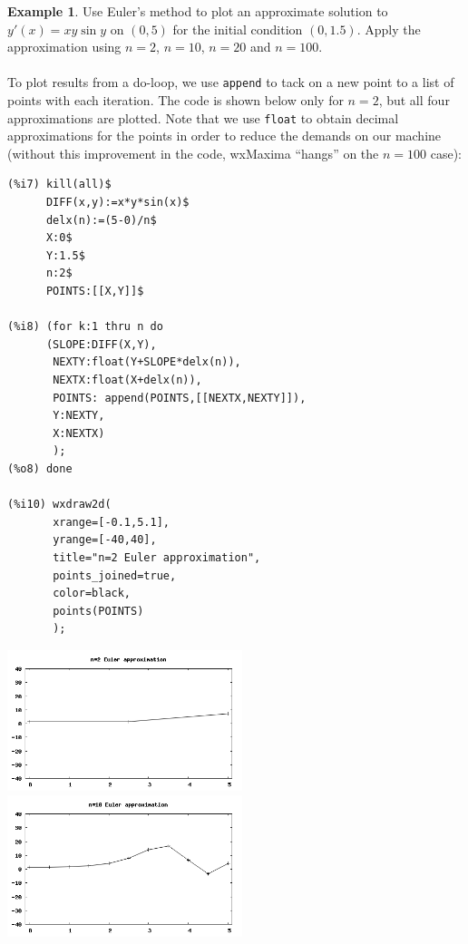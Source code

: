 \documentclass[10.5pt,twoside]{report}
\theoremstyle{definition}
\newtheorem{exmp}{Example}[section]
\begin{document}
\begin{exmp} Use Euler's method to plot an approximate solution to $y'(x)=xy\sin{y}$ on $(0,5)$ for the initial condition $(0,1.5)$.  Apply the approximation using $n=2$, $n=10$, $n=20$ and $n=100$.\\
${}$\\
To plot results from a do-loop, we use \verb|append| to tack on a new point to a list of points with each iteration.  The code is shown below only for $n=2$, but all four approximations are plotted.  Note that we use \verb|float| to obtain decimal approximations for the points in order to reduce the demands on our machine (without this improvement in the code, wxMaxima ``hangs'' on the $n=100$ case):

\begin{verbatim}
(%i7) kill(all)$
      DIFF(x,y):=x*y*sin(x)$
      delx(n):=(5-0)/n$
      X:0$
      Y:1.5$
      n:2$
      POINTS:[[X,Y]]$
      
(%i8) (for k:1 thru n do
      (SLOPE:DIFF(X,Y),
       NEXTY:float(Y+SLOPE*delx(n)),
       NEXTX:float(X+delx(n)),
       POINTS: append(POINTS,[[NEXTX,NEXTY]]),
       Y:NEXTY,
       X:NEXTX)
       );
(%o8) done

(%i10) wxdraw2d(
       xrange=[-0.1,5.1],
       yrange=[-40,40],
       title="n=2 Euler approximation",
       points_joined=true,
       color=black,
       points(POINTS)
       );
\end{verbatim}

\includegraphics[width=2.7in]{example_4_5_2_1}
\includegraphics[width=2.7in]{example_4_5_2_2}


\end{exmp}
\end{document}
